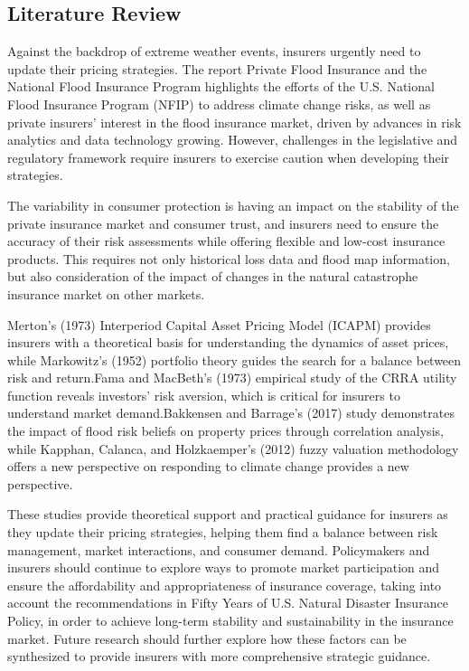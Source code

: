 \documentclass[12pt]{article}  %
\begin{document}
\subsection{Literature Review}
Against the backdrop of extreme weather events, insurers urgently need to update their pricing strategies. The report Private Flood Insurance and the National Flood Insurance Program highlights the efforts of the U.S. National Flood Insurance Program (NFIP) to address climate change risks, as well as private insurers' interest in the flood insurance market, driven by advances in risk analytics and data technology growing. However, challenges in the legislative and regulatory framework require insurers to exercise caution when developing their strategies.

The variability in consumer protection is having an impact on the stability of the private insurance market and consumer trust, and insurers need to ensure the accuracy of their risk assessments while offering flexible and low-cost insurance products. This requires not only historical loss data and flood map information, but also consideration of the impact of changes in the natural catastrophe insurance market on other markets.

Merton's (1973) Interperiod Capital Asset Pricing Model (ICAPM) provides insurers with a theoretical basis for understanding the dynamics of asset prices, while Markowitz's (1952) portfolio theory guides the search for a balance between risk and return.Fama and MacBeth's (1973) empirical study of the CRRA utility function reveals investors' risk aversion, which is critical for insurers to understand market demand.Bakkensen and Barrage's (2017) study demonstrates the impact of flood risk beliefs on property prices through correlation analysis, while Kapphan, Calanca, and Holzkaemper's (2012) fuzzy valuation methodology offers a new perspective on responding to climate change provides a new perspective.

These studies provide theoretical support and practical guidance for insurers as they update their pricing strategies, helping them find a balance between risk management, market interactions, and consumer demand. Policymakers and insurers should continue to explore ways to promote market participation and ensure the affordability and appropriateness of insurance coverage, taking into account the recommendations in Fifty Years of U.S. Natural Disaster Insurance Policy, in order to achieve long-term stability and sustainability in the insurance market. Future research should further explore how these factors can be synthesized to provide insurers with more comprehensive strategic guidance.
\end{document}
